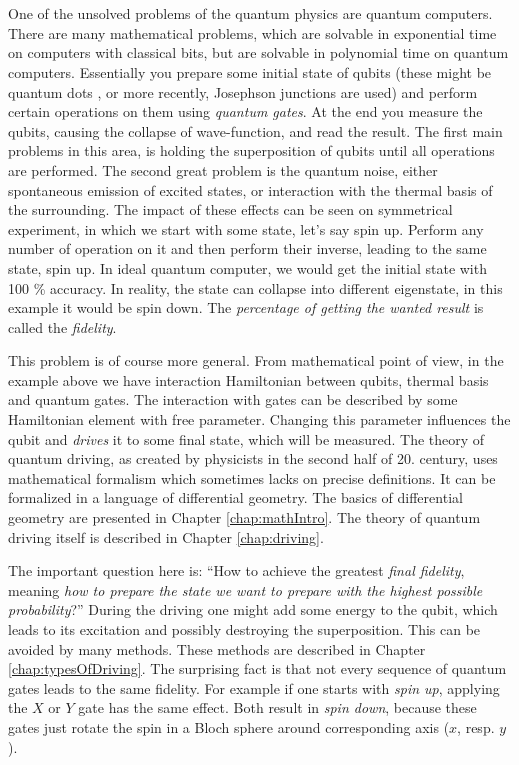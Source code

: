 \chapter*{}
One of the unsolved problems of the quantum physics are quantum computers. There are many mathematical problems, which are solvable in exponential time on computers with classical bits, but are solvable in polynomial time on quantum computers. Essentially you prepare some initial state of qubits (these might be quantum dots \citep{dots}, or more recently, Josephson junctions \citep{josephson} are used) and perform certain operations on them using \emph{quantum gates}. At the end you measure the qubits, causing the collapse of wave-function, and read the result. The first main problems in this area, is holding the superposition of qubits until all operations are performed. The second great problem is the quantum noise, either spontaneous emission of excited states, or interaction with the thermal basis of the surrounding. The impact of these effects can be seen on symmetrical experiment, in which we start with some state, let's say spin up. Perform any number of operation on it and then perform their inverse, leading to the same state, spin up. In ideal quantum computer, we would get the initial state with 100 \% accuracy. In reality, the state can collapse into different eigenstate, in this example it would be spin down. The \emph{percentage of getting the wanted result} is called the \emph{fidelity}.

This problem is of course more general. From mathematical point of view, in the example above we have interaction Hamiltonian between qubits, thermal basis and quantum gates. The interaction with gates can be described by some Hamiltonian element with free parameter. Changing this parameter influences the qubit and \emph{drives} it to some final state, which will be measured. The theory of quantum driving, as created by physicists in the second half of 20. century, uses mathematical formalism which sometimes lacks on precise definitions. It can be formalized in a language of differential geometry. The basics of differential geometry are presented in Chapter \ref{chap:mathIntro}. The theory of quantum driving itself is described in Chapter \ref{chap:driving}. 

The important question here is: “How to achieve the greatest \emph{final fidelity}, meaning \emph{how to prepare the state we want to prepare with the highest possible probability}?” During the driving one might add some energy to the qubit, which leads to its excitation and possibly destroying the superposition. This can be avoided by many methods. These methods are described in Chapter \ref{chap:typesOfDriving}. The surprising fact is that not every sequence of quantum gates leads to the same fidelity. For example if one starts with \emph{spin up}, applying the $X$ or $Y$ gate has the same effect. Both result in \emph{spin down}, because these gates just rotate the spin in a Bloch sphere around corresponding axis ($x$, resp. $y$).

